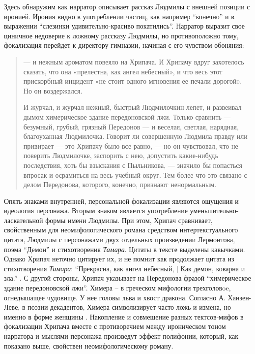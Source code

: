 \documentclass[12pt,a4paper]{article}
\begin{document}
Здесь обнаружим как нарратор описывает рассказ Людмилы с внешней позиции с иронией. Ирония видно в употреблении частиц, как например \enquote{конечно} и в выражении \enquote{слезинки удивительно-красиво покатились}. Нарратор выразит свое циничное недоверие к ложному рассказу Людмилы, но противоположно тому, фокализация перейдет к директору гимназии, начиная с его чувством обоняния:

\begin{quote}

— и нежным ароматом повеяло на Хрипача. И Хрипачу
вдруг захотелось сказать, что она «прелестна, как ангел небесный», и
что весь этот прискорбный инцидент «не стоит одного мгновения ее 
печали дорогой». Но он воздержался.

И журчал, и журчал нежный, быстрый Людмилочкин лепет, и 
развеивал дымом химерическое здание передоновской лжи. Только 
сравнить — безумный, грубый, грязный Передонов — и веселая, светлая,
нарядная, благоуханная Людмилочка. Говорит ли совершенную 
Людмила правду или привирает — это Хрипачу было все равно, — но он 
чувствовал, что не поверить Людмилочке, заспорить с нею, допустить 
какие-нибудь последствия, хоть бы взыскания с Пыльникова, — значило
бы попасться впросак и осрамиться на весь учебный округ. Тем более
что это связано с делом Передонова, которого, конечно, признают 
ненормальным.

\parencite[240]{sologub2004}
\end{quote}

Опять знаками внутренней, персональной фокализации являются ощущения и идеология персонажа. Вторым знаком является употребление уменьшительно-ласкательной формы имени Людмилы.  При этом, Хрипач сравнивает, свойственным для неомифологического романа средством интертекстуального цитата, Людмилы с персонажами двух отдельных произведении Лермонтова, поэма \enquote{Демон} и стихотворения \emph{Тамара}. Цитаты в тексте выделены кавычками. Однако Хрипач неточно цитирует их, и не помнит как продолжает цитата из стихотворения \emph{Тамара}: \enquote{Прекрасна, как ангел небесный, | Как демон, коварна и зла.} \parencite[194]{lermontov2000}. С другой стороны, Хрипач указывает на Передонова фразой \enquote{химерическое здание передоновской лжи}. Химера – в греческом мифологии трехголовoe, огнедышащее чудовище. У нее головы льва и хвост дракона. Согласно А. Ханзен-Леве, в поэзии декадентов, Химера символизирует часто ложь и измена, но именно в форме женщины \parencite[200]{hansen-love1999}. Накопление и совмещение разных тектсов-мифов в фокализации Хрипача вместе с противоречием между ироническом тоном нарратора и мыслями персонажа произведут эффект полифонии, который, как показано выше, свойствен неомифологическому роману.
\end{document}

